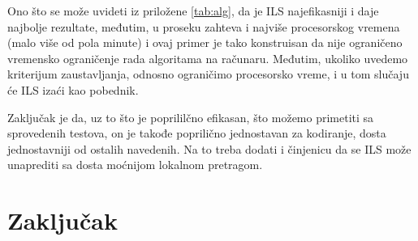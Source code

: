 \documentclass[a4paper]{article}
\begin{document}
Ono što se može uvideti iz priložene \autoref{tab:alg}, da je ILS najefikasniji i daje najbolje rezultate, međutim, u proseku zahteva i najviše procesorskog vremena (malo više od pola minute) i ovaj primer je tako konstruisan da nije ograničeno vremensko ograničenje rada algoritama na računaru. Međutim, ukoliko uvedemo kriterijum zaustavljanja, odnosno ograničimo procesorsko vreme, i u tom slučaju će ILS izaći kao pobednik.

Zaključak je da, uz to što je poprililčno efikasan, što možemo primetiti sa sprovedenih testova, on je takođe poprilično jednostavan za kodiranje, dosta jednostavniji od ostalih navedenih. Na to treba dodati i činjenicu da se ILS može unaprediti sa dosta moćnijom lokalnom pretragom.








\section{Zaključak}
\label{sec:zakljucak}
\end{document}
